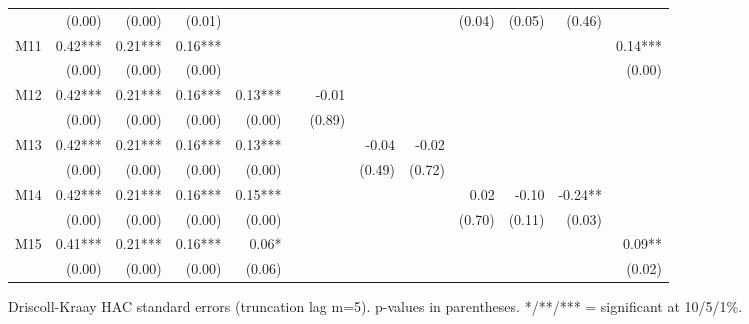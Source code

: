 \begin{table}[htbp]
{\begin{tabular}{lrrrrrrrrrrrr}
 & (0.00) & (0.00) & (0.01) &  &  &  &  &  & (0.04) & (0.05) & (0.46) &  \\
M11 & 0.42*** & 0.21*** & 0.16*** &  &  &  &  &  &  &  &  & 0.14*** \\
 & (0.00) & (0.00) & (0.00) &  &  &  &  &  &  &  &  & (0.00) \\
M12 & 0.42*** & 0.21*** & 0.16*** & 0.13*** &  & -0.01 &  &  &  &  &  &  \\
 & (0.00) & (0.00) & (0.00) & (0.00) &  & (0.89) &  &  &  &  &  &  \\
M13 & 0.42*** & 0.21*** & 0.16*** & 0.13*** &  &  & -0.04 & -0.02 &  &  &  &  \\
 & (0.00) & (0.00) & (0.00) & (0.00) &  &  & (0.49) & (0.72) &  &  &  &  \\
M14 & 0.42*** & 0.21*** & 0.16*** & 0.15*** &  &  &  &  & 0.02 & -0.10 & -0.24** &  \\
 & (0.00) & (0.00) & (0.00) & (0.00) &  &  &  &  & (0.70) & (0.11) & (0.03) &  \\
M15 & 0.41*** & 0.21*** & 0.16*** & 0.06* &  &  &  &  &  &  &  & 0.09** \\
 & (0.00) & (0.00) & (0.00) & (0.06) &  &  &  &  &  &  &  & (0.02) \\
\bottomrule
\end{tabular}%
}
\smallskip
\small
\noindent Driscoll-Kraay HAC standard errors (truncation lag m=5). p-values in parentheses. */**/*** = significant at 10/5/1\%.
\end{table}